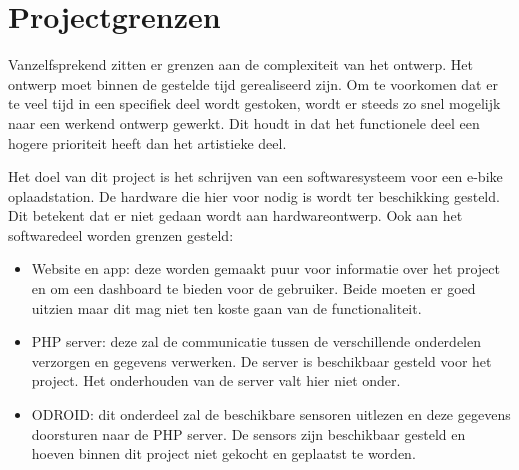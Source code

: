 \section{Projectgrenzen}
Vanzelfsprekend zitten er grenzen aan de complexiteit van het ontwerp. Het ontwerp moet binnen de gestelde tijd gerealiseerd zijn. Om te voorkomen dat er te veel tijd in een specifiek deel wordt gestoken, wordt er steeds zo snel mogelijk naar een werkend ontwerp gewerkt. Dit houdt in dat het functionele deel een hogere prioriteit heeft dan het artistieke deel.

Het doel van dit project is het schrijven van een softwaresysteem voor een e-bike oplaadstation. De hardware die hier voor nodig is wordt ter beschikking gesteld. Dit betekent dat er niet gedaan wordt aan hardwareontwerp. Ook aan het softwaredeel worden grenzen gesteld:
\begin{itemize}
\item Website en app: deze worden gemaakt puur voor informatie over het project en om een dashboard te bieden voor de gebruiker. Beide moeten er goed uitzien maar dit mag niet ten koste gaan van de functionaliteit.
\item PHP server: deze zal de communicatie tussen de verschillende onderdelen verzorgen en gegevens verwerken. De server is beschikbaar gesteld voor het project. Het onderhouden van de server valt hier niet onder.
\item ODROID: dit onderdeel zal de beschikbare sensoren uitlezen en deze gegevens doorsturen naar de PHP server. De sensors zijn beschikbaar gesteld en hoeven binnen dit project niet gekocht en geplaatst te worden.
\end{itemize}
